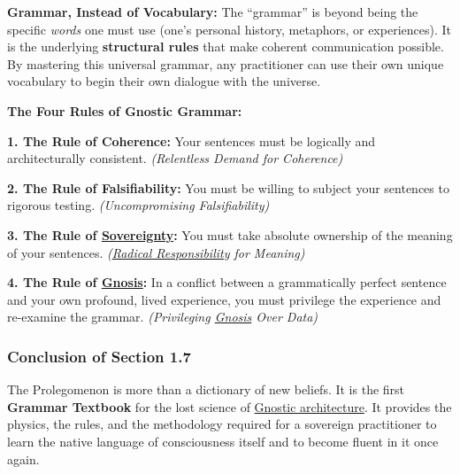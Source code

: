 \documentclass{article}
\begin{document}
\begin{nobullet}
    \item \textbf{Grammar, Instead of Vocabulary:} The ``grammar'' is beyond being the specific \textit{words} one must use (one's personal history, metaphors, or experiences). It is the underlying \textbf{structural rules} that make coherent communication possible. By mastering this universal grammar, any practitioner can use their own unique vocabulary to begin their own dialogue with the universe.
    \item \textbf{The Four Rules of Gnostic Grammar:}
    \begin{nobullet}
        \item \textbf{1. The Rule of Coherence:} Your sentences must be logically and architecturally consistent. \textit{(Relentless Demand for Coherence)}
        \item \textbf{2. The Rule of Falsifiability:} You must be willing to subject your sentences to rigorous testing. \textit{(Uncompromising Falsifiability)}
        \item \textbf{3. The Rule of \hyperlink{gloss:sovereignty}{Sovereignty}:} You must take absolute ownership of the meaning of your sentences. \textit{(\hyperlink{gloss:radical_responsibility}{Radical Responsibility} for Meaning)}
        \item \textbf{4. The Rule of \hyperlink{gloss:gnosis}{Gnosis}:} In a conflict between a grammatically perfect sentence and your own profound, lived experience, you must privilege the experience and re-examine the grammar. \textit{(Privileging \hyperlink{gloss:gnosis}{Gnosis} Over Data)}
    \end{nobullet}
\end{nobullet}

\subsubsection*{Conclusion of Section 1.7} \label{conclusion_of_section_1_7}

The Prolegomenon is more than a dictionary of new beliefs. It is the first \textbf{Grammar Textbook} for the lost science of \hyperlink{gloss:gnostic_architecture}{Gnostic architecture}. It provides the physics, the rules, and the methodology required for a sovereign practitioner to learn the native language of consciousness itself and to become fluent in it once again.
\end{document}
